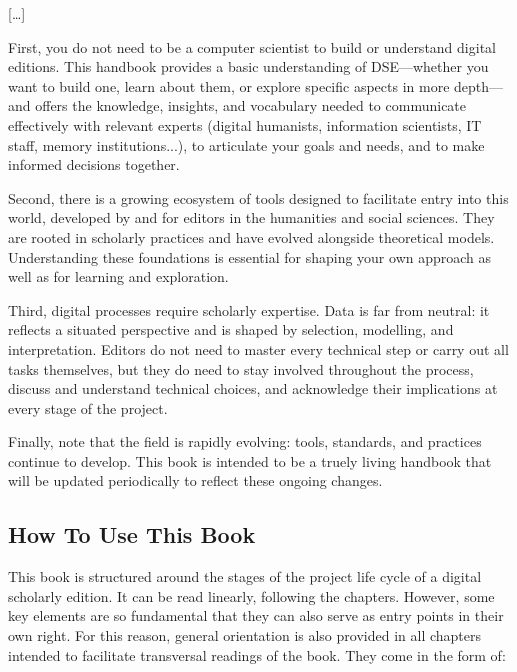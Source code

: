 \documentclass[
  letterpaper,
  DIV=11,
  numbers=noendperiod]{scrreprt}
\begin{document}
{[}\ldots{]}

First, you do not need to be a computer scientist to build or understand
digital editions. This handbook provides a basic understanding of
DSE---whether you want to build one, learn about them, or explore
specific aspects in more depth---and offers the knowledge, insights, and
vocabulary needed to communicate effectively with relevant experts
(digital humanists, information scientists, IT staff, memory
institutions...), to articulate your goals and needs, and to make
informed decisions together.

Second, there is a growing ecosystem of tools designed to facilitate
entry into this world, developed by and for editors in the humanities
and social sciences. They are rooted in scholarly practices and have
evolved alongside theoretical models. Understanding these foundations is
essential for shaping your own approach as well as for learning and
exploration.

Third, digital processes require scholarly expertise. Data is far from
neutral: it reflects a situated perspective and is shaped by selection,
modelling, and interpretation. Editors do not need to master every
technical step or carry out all tasks themselves, but they do need to
stay involved throughout the process, discuss and understand technical
choices, and acknowledge their implications at every stage of the
project.

Finally, note that the field is rapidly evolving: tools, standards, and
practices continue to develop. This book is intended to be a truely
living handbook that will be updated periodically to reflect these
ongoing changes.

\subsection{How To Use This Book}\label{how-to-use-this-book}

This book is structured around the stages of the project life cycle of a
digital scholarly edition. It can be read linearly, following the
chapters. However, some key elements are so fundamental that they can
also serve as entry points in their own right. For this reason, general
orientation is also provided in all chapters intended to facilitate
transversal readings of the book. They come in the form of:
\end{document}
